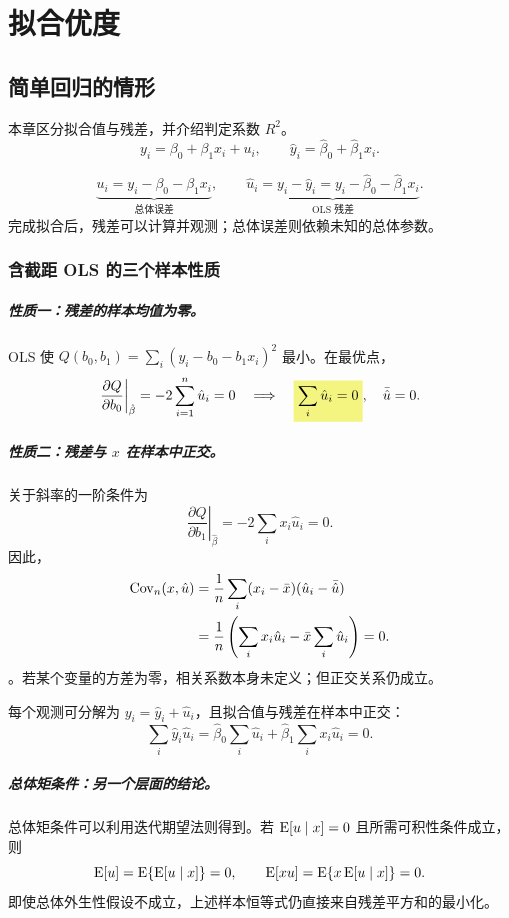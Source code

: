 \chapter{拟合优度}
\label{ch:week3}
\section{简单回归的情形}
\label{sec:simple-properties}
本章区分拟合值与残差，并介绍判定系数 $R^2$。
\[y_i=\beta_0+\beta_1x_i+u_i,\qquad
\hat y_i=\hat\beta_0+\hat\beta_1x_i.\]
\begin{definition}[误差与残差]
\[\underbrace{u_i=y_i-\beta_0-\beta_1x_i}_{\text{总体误差}},\qquad
\underbrace{\hat u_i=y_i-\hat y_i=y_i-\hat\beta_0-\hat\beta_1x_i}_{\text{OLS 残差}}.\]
完成拟合后，残差可以计算并观测；总体误差则依赖未知的总体参数。
\end{definition}

\subsection{含截距 OLS 的三个样本性质}
\paragraph{性质一：残差的样本均值为零。}
OLS 使 $Q(b_0,b_1)=\sum_i(y_i-b_0-b_1x_i)^2$ 最小。在最优点，
\[\left.\frac{\partial Q}{\partial b_0}\right|_{\hat\beta}
=-2\sum_{i=1}^n\hat u_i=0
\quad\Longrightarrow\quad\hm{\sum_i\hat u_i=0},\quad\bar{\hat u}=0.\]

\paragraph{性质二：残差与 $x$ 在样本中正交。}
关于斜率的一阶条件为
\[\left.\frac{\partial Q}{\partial b_1}\right|_{\hat\beta}
=-2\sum_i x_i\hat u_i=0.\]
因此，
\begin{align*}
\operatorname{Cov}_n(x,\hat u)
&=\frac1n\sum_i(x_i-\bar x)(\hat u_i-\bar{\hat u})\\
&=\frac1n\left(\sum_i x_i\hat u_i-\bar x\sum_i\hat u_i\right)=0.
\end{align*}
。若某个变量的方差为零，相关系数本身未定义；但正交关系仍成立。

每个观测可分解为 $y_i=\hat y_i+\hat u_i$，且拟合值与残差在样本中正交：
\[\sum_i\hat y_i\hat u_i
=\hat\beta_0\sum_i\hat u_i+\hat\beta_1\sum_i x_i\hat u_i=0.\]

\paragraph{总体矩条件：另一个层面的结论。}
总体矩条件可以利用迭代期望法则得到。若 $\operatorname{E}[u\mid x]=0$ 且所需可积性条件成立，则
\[\operatorname{E}[u]=\operatorname{E}\{\operatorname{E}[u\mid x]\}=0,\qquad
\operatorname{E}[xu]=\operatorname{E}\{x\operatorname{E}[u\mid x]\}=0.\]
即使总体外生性假设不成立，上述样本恒等式仍直接来自残差平方和的最小化。

